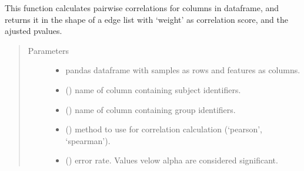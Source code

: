 \documentclass[letterpaper,10pt,english]{sphinxmanual}
\begin{document}

\begin{fulllineitems}
\label{\detokenize{_autosummary/analytics_core.analytics:analytics_core.analytics.analytics.run_correlation}}
This function calculates pairwise correlations for columns in dataframe, and returns it in the shape of a edge list with ‘weight’ as correlation score, and the ajusted p\sphinxhyphen{}values.
\begin{quote}\begin{description}
\item[{Parameters}] \leavevmode\begin{itemize}
\item {} 
 \textendash{} pandas dataframe with samples as rows and features as columns.

\item {} 
 () \textendash{} name of column containing subject identifiers.

\item {} 
 () \textendash{} name of column containing group identifiers.

\item {} 
 () \textendash{} method to use for correlation calculation (‘pearson’, ‘spearman’).

\item {} 
 () \textendash{} error rate. Values velow alpha are considered significant.


\end{itemize}
\end{description}
\end{quote}
\end{fulllineitems}
\end{document}
